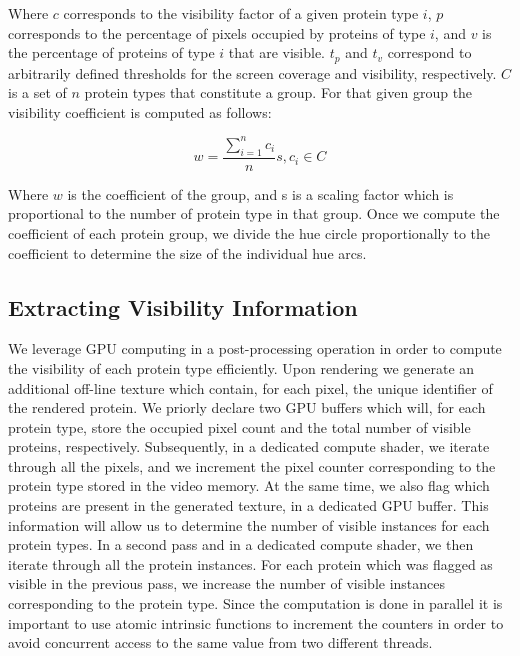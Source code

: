 \documentclass[review,journal]{vgtc}         %
\begin{document}
Where $c$ corresponds to the visibility factor of a given protein type $i$, $p$ corresponds to the percentage of pixels occupied by proteins of type $i$, and $v$ is the percentage of proteins of type $i$ that are visible.
$t_{p}$ and $t_{v}$ correspond to arbitrarily defined thresholds for the screen coverage and visibility, respectively. 
$C$ is a set of $n$ protein types that constitute a group.
For that given group the visibility coefficient is computed as follows:

\begin{equation}
w = \frac{\sum_{i=1}^{n} c_{i}}{n} s, c_{i} \in C
\end{equation}

Where $w$ is the coefficient of the group, and s is a scaling factor which is proportional to the number of protein type in that group. 
Once we compute the coefficient of each protein group, we divide the hue circle proportionally to the coefficient to determine the size of the individual hue arcs. \\

\subsection{Extracting Visibility Information}

We leverage GPU computing in a post-processing operation in order to compute the visibility of each protein type efficiently.
Upon rendering we generate an additional off-line texture which contain, for each pixel, the unique identifier of the rendered protein.
We priorly declare two GPU buffers which will, for each protein type, store the occupied pixel count and the total number of visible proteins, respectively.
Subsequently, in a dedicated compute shader, we iterate through all the pixels, and we increment the pixel counter corresponding to the protein type stored in the video memory.
At the same time, we also flag which proteins are present in the generated texture, in a dedicated GPU buffer.
This information will allow us to determine the number of visible instances for each protein types.
In a second pass and in a dedicated compute shader, we then iterate through all the protein instances.
For each protein which was flagged as visible in the previous pass, we increase the number of visible instances corresponding to the protein type.
Since the computation is done in parallel it is important to use atomic intrinsic functions to increment the counters in order to avoid concurrent access to the same value from two different threads.
\end{document}
